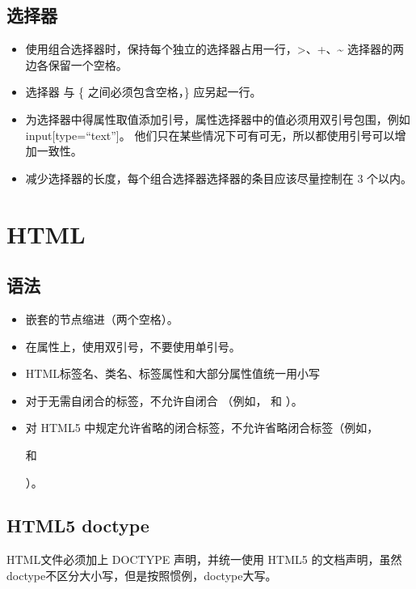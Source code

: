 \documentclass[]{report}
\providecommand{\tightlist}{%
  \setlength{\itemsep}{0pt}\setlength{\parskip}{0pt}}
\begin{document}
\hypertarget{ux9009ux62e9ux5668}{%
\section{选择器}\label{ux9009ux62e9ux5668}}

\begin{itemize}
\tightlist
\item
  使用组合选择器时，保持每个独立的选择器占用一行，\textgreater{}、+、\textasciitilde{}
  选择器的两边各保留一个空格。
\item
  选择器 与 \{ 之间必须包含空格，\} 应另起一行。
\item
  为选择器中得属性取值添加引号，属性选择器中的值必须用双引号包围，例如
  input{[}type=``text''{]}。
  他们只在某些情况下可有可无，所以都使用引号可以增加一致性。
\item
  减少选择器的长度，每个组合选择器选择器的条目应该尽量控制在 3 个以内。
\end{itemize}

\hypertarget{html}{%
\chapter{HTML}\label{html}}

\hypertarget{ux8bedux6cd5-1}{%
\section{语法}\label{ux8bedux6cd5-1}}

\begin{itemize}
\tightlist
\item
  嵌套的节点缩进（两个空格）。
\item
  在属性上，使用双引号，不要使用单引号。
\item
  HTML标签名、类名、标签属性和大部分属性值统一用小写
\item
  对于无需自闭合的标签，不允许自闭合 （例如， 和 ）。
\item
  对 HTML5 中规定允许省略的闭合标签，不允许省略闭合标签（例如，

  和

  ）。
\end{itemize}

\hypertarget{html5-doctype}{%
\section{HTML5 doctype}\label{html5-doctype}}

HTML文件必须加上 DOCTYPE 声明，并统一使用 HTML5
的文档声明，虽然doctype不区分大小写，但是按照惯例，doctype大写。
\end{document}

